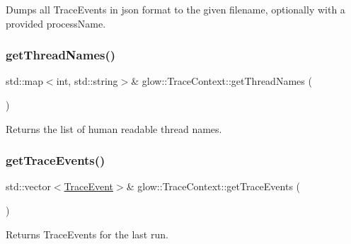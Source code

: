Dumps all Trace\+Events in json format to the given {\ttfamily filename}, optionally with a provided {\ttfamily process\+Name}. \mbox{\label{classglow_1_1_trace_context_a57fb8a38c0ab7d3b17c1e61e504bd359}} 
\subsubsection{\texorpdfstring{get\+Thread\+Names()}{getThreadNames()}}
{\footnotesize\ttfamily std\+::map$<$int, std\+::string$>$\& glow\+::\+Trace\+Context\+::get\+Thread\+Names (\begin{DoxyParamCaption}{ }\end{DoxyParamCaption})\hspace{0.3cm}{\ttfamily [inline]}}

\begin{DoxyReturn}{Returns}
the list of human readable thread names. 
\end{DoxyReturn}
\mbox{\label{classglow_1_1_trace_context_ac70c1c3538abbb536854e37ce1b37537}} 
\subsubsection{\texorpdfstring{get\+Trace\+Events()}{getTraceEvents()}\hspace{0.1cm}{\footnotesize\ttfamily [1/2]}}
{\footnotesize\ttfamily std\+::vector$<$\hyperlink{structglow_1_1_trace_event}{Trace\+Event}$>$\& glow\+::\+Trace\+Context\+::get\+Trace\+Events (\begin{DoxyParamCaption}{ }\end{DoxyParamCaption})\hspace{0.3cm}{\ttfamily [inline]}}

\begin{DoxyReturn}{Returns}
Trace\+Events for the last run. 
\end{DoxyReturn}
\mbox{\label{classglow_1_1_trace_context_ab0bb924d7e2cdc2f0097959f4e5cfb3f}} 
